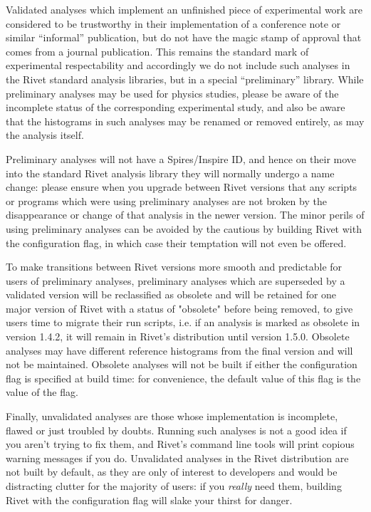 Validated analyses which implement an unfinished piece of experimental work are
considered to be trustworthy in their implementation of a conference note or
similar ``informal'' publication, but do not have the magic stamp of approval
that comes from a journal publication. This remains the standard mark of
experimental respectability and accordingly we do not include such analyses in
the Rivet standard analysis libraries, but in a special ``preliminary''
library. While preliminary analyses may be used for physics studies, please be
aware of the incomplete status of the corresponding experimental study, and also
be aware that the histograms in such analyses may be renamed or removed
entirely, as may the analysis itself.

Preliminary analyses will not have a Spires/Inspire ID, and hence on their
move into the standard Rivet analysis library they will normally undergo a name
change: please ensure when you upgrade between Rivet versions that any scripts
or programs which were using preliminary analyses are not broken by the
disappearance or change of that analysis in the newer version. The minor perils
of using preliminary analyses can be avoided by the cautious by building Rivet
with the  configuration flag, in which case their
temptation will not even be offered.

To make transitions between Rivet versions more smooth and predictable for users
of preliminary analyses, preliminary analyses which are superseded by a
validated version will be reclassified as obsolete and will be retained for one
major version of Rivet with a status of "obsolete" before being removed, to give
users time to migrate their run scripts, i.e. if an analysis is marked as
obsolete in version 1.4.2, it will remain in Rivet's distribution until version
1.5.0.  Obsolete analyses may have different reference histograms from the final
version and will not be maintained. Obsolete analyses will not be built if
either the  configuration flag is specified at build
time: for convenience, the default value of this flag is the value of the
 flag.

Finally, unvalidated analyses are those whose implementation is incomplete,
flawed or just troubled by doubts. Running such analyses is not a good idea if
you aren't trying to fix them, and Rivet's command line tools will print copious
warning messages if you do. Unvalidated analyses in the Rivet distribution are
not built by default, as they are only of interest to developers and would be
distracting clutter for the majority of users: if you \emph{really} need them,
building Rivet with the  configuration flag will
slake your thirst for danger.


